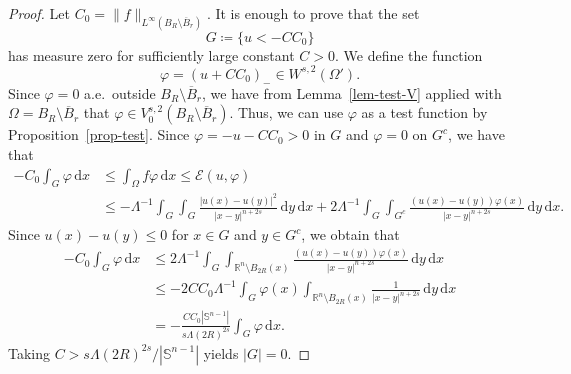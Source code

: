 \documentclass[10pt,a4paper]{amsart}
\begin{document}
\begin{proof}
Let $C_0 = \|f\|_{L^\infty(B_R \setminus \overline{B}_r)}$. It is enough to prove that the set
\begin{equation*}
G\coloneqq\{u<-CC_0\}
\end{equation*}
has measure zero for sufficiently large constant $C>0$. We define the function
\begin{equation*}
\varphi=(u+CC_0)_-\in W^{s, 2}(\Omega').
\end{equation*}
Since $\varphi=0$ a.e.\ outside $B_R \setminus \overline{B}_r$, we have from Lemma~\ref{lem-test-V} applied with $\Omega=B_R \setminus \overline{B}_r$ that $\varphi \in V^{s, 2}_0(B_R \setminus \overline{B}_r)$. Thus, we can use $\varphi$ as a test function by Proposition~\ref{prop-test}. Since $\varphi=-u-CC_0>0$ in $G$ and $\varphi=0$ on $G^c$, we have that
\begin{align*}
-C_0 \int_G \varphi \,\mathrm{d}x
&\leq \int_\Omega f\varphi \,\mathrm{d}x \leq \mathcal{E}(u, \varphi) \\
&\leq - \Lambda^{-1}\int_G \int_G \frac{|u(x)-u(y)|^2}{|x-y|^{n+2s}} \,\mathrm{d}y \,\mathrm{d}x + 2\Lambda^{-1}\int_G \int_{G^c} \frac{(u(x)-u(y))\varphi(x)}{|x-y|^{n+2s}} \,\mathrm{d}y \,\mathrm{d}x.
\end{align*}
Since $u(x)-u(y) \leq 0$ for $x \in G$ and $y \in G^c$, we obtain that
\begin{align*}
-C_0 \int_G \varphi \,\mathrm{d}x
&\leq 2\Lambda^{-1}\int_G \int_{\mathbb{R}^n \setminus B_{2R}(x)} \frac{(u(x)-u(y))\varphi(x)}{|x-y|^{n+2s}} \,\mathrm{d}y \,\mathrm{d}x \\
&\leq -2CC_0 \Lambda^{-1} \int_G \varphi(x) \int_{\mathbb{R}^n \setminus B_{2R}(x)} \frac{1}{|x-y|^{n+2s}} \,\mathrm{d}y \,\mathrm{d}x \\
&= - \frac{CC_0 |\mathbb{S}^{n-1}|}{s \Lambda (2R)^{2s}} \int_G \varphi \,\mathrm{d}x.
\end{align*}
Taking $C>s\Lambda(2R)^{2s}/|\mathbb{S}^{n-1}|$ yields $|G|=0$.
\end{proof}
\end{document}
